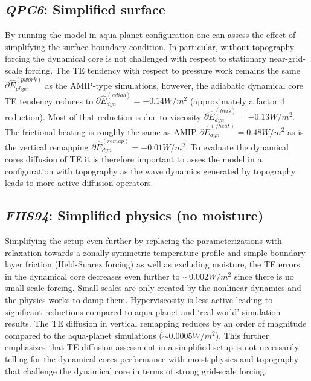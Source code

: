 \documentclass[draft,linenumbers]{agujournal}
\newcommand*{\gi}[1]{\widehat{#1}}
\begin{document}
\subsection{{\em{QPC6}}: Simplified surface}\label{sec:QPC6}
By running the model in aqua-planet configuration one can assess the effect of simplifying the surface boundary condition. In particular, without topography forcing the dynamical core is not challenged with respect to stationary near-grid-scale forcing. The TE tendency with respect to pressure work {\color{red}{error}} remains the same $\partial \gi{E}_{phys}^{({pwork})}$ as the AMIP-type simulations, however, the adiabatic dynamical core TE tendency reduces to $\partial \gi{E}_{dyn}^{({adiab})}=-0.14 W/m^2$ (approximately a factor 4 reduction). Most of that reduction is due to viscosity $\partial \gi{E}_{dyn}^{(hvis)}=-0.13 W/m^2$. The frictional heating is roughly the same as AMIP $\partial \gi{E}_{dyn}^{(fheat)}=0.48 W/m^2$ as is the vertical remapping  $\partial \gi{E}_{dyn}^{(remap)}=-0.01 W/m^2$. To evaluate the dynamical cores diffusion of TE it is therefore important to asses the model in a configuration with topography as the wave dynamics generated by topography leads to more active diffusion operators.
\subsection{{\em{FHS94}}: Simplified physics (no moisture)}\label{sec:FHS94}
Simplifying the setup even further by replacing the parameterizations with relaxation towards a zonally symmetric temperature profile and simple boundary layer friction (Held-Suarez forcing) as well as excluding moisture, the TE errors in the dynamical core decreases even further to $\sim 0.002W/m^2$ since there is no small scale forcing. Small scales are only created by the nonlinear dynamics and the physics works to damp them. Hyperviscosity is less active leading to significant reductions compared to aqua-planet and `real-world' simulation results. The TE diffusion in vertical remapping reduces by an order of magnitude compared to the aqua-planet simulations ($\sim 0.0005W/m^2$). This further emphasizes that TE diffusion assessment in a simplified setup is not necessarily telling for the dynamical cores performance with moist physics and topography that challenge the dynamical core in terms of strong grid-scale forcing.
\end{document}
